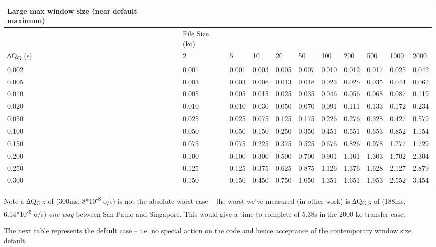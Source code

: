 \documentclass[]{article}
\begin{document}
\begin{longtable}[]{@{}lllllllllll@{}}
\toprule
Large max window size (near default maximum) & & & & & & & & &
&\tabularnewline
\midrule
\endhead
& File Size (ko) & & & & & & & & &\tabularnewline
∆Q\textbar{}\textsubscript{G} (s) & 2 & 5 & 10 & 20 & 50 & 100 & 200 &
500 & 1000 & 2000\tabularnewline
0.002 & 0.001 & 0.001 & 0.003 & 0.005 & 0.007 & 0.010 & 0.012 & 0.017 &
0.025 & 0.042\tabularnewline
0.005 & 0.003 & 0.003 & 0.008 & 0.013 & 0.018 & 0.023 & 0.028 & 0.035 &
0.044 & 0.062\tabularnewline
0.010 & 0.005 & 0.005 & 0.015 & 0.025 & 0.035 & 0.046 & 0.056 & 0.068 &
0.087 & 0.119\tabularnewline
0.020 & 0.010 & 0.010 & 0.030 & 0.050 & 0.070 & 0.091 & 0.111 & 0.133 &
0.172 & 0.234\tabularnewline
0.050 & 0.025 & 0.025 & 0.075 & 0.125 & 0.175 & 0.226 & 0.276 & 0.328 &
0.427 & 0.579\tabularnewline
0.100 & 0.050 & 0.050 & 0.150 & 0.250 & 0.350 & 0.451 & 0.551 & 0.653 &
0.852 & 1.154\tabularnewline
0.150 & 0.075 & 0.075 & 0.225 & 0.375 & 0.525 & 0.676 & 0.826 & 0.978 &
1.277 & 1.729\tabularnewline
0.200 & 0.100 & 0.100 & 0.300 & 0.500 & 0.700 & 0.901 & 1.101 & 1.303 &
1.702 & 2.304\tabularnewline
0.250 & 0.125 & 0.125 & 0.375 & 0.625 & 0.875 & 1.126 & 1.376 & 1.628 &
2.127 & 2.879\tabularnewline
0.300 & 0.150 & 0.150 & 0.450 & 0.750 & 1.050 & 1.351 & 1.651 & 1.953 &
2.552 & 3.454\tabularnewline
\bottomrule
\end{longtable}

Note a ∆Q\textbar{}\textsubscript{G,S} of (300ms,
8*10\textsuperscript{-8} o/s) is not the absolute worst case -- the
worst we've measured (in other work) is ∆Q\textbar{}\textsubscript{G,S}
of (188ms, 6.14*10\textsuperscript{-5} o/s) \emph{one-way} between San
Paulo and Singapore. This would give a time-to-complete of 5.38s in the
2000 ko transfer case.

The next table represents the default case -- i.e. no special action on
the code and hence acceptance of the contemporary window size default.
\end{document}
